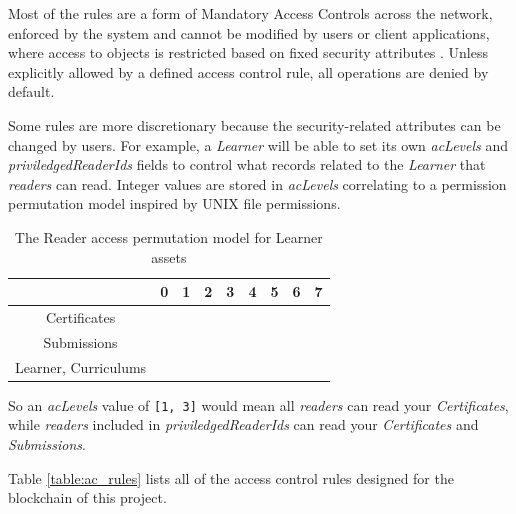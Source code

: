 Most of the rules are a form of Mandatory Access Controls across the network, enforced by the system and cannot be modified by
users or client applications, where access to objects is restricted based on fixed security attributes \citep{yuan2005attributed}.
Unless explicitly allowed by a defined access control rule, all operations are denied by default.

Some rules are more discretionary because the security-related attributes can be changed by users.
For example, a \textit{Learner} will be able to set its own \textit{acLevels} and \textit{priviledgedReaderIds} fields to control
what records related to the \textit{Learner} that \textit{readers} can read. Integer values are stored in \textit{acLevels} correlating to
a permission permutation model inspired by UNIX file permissions.

\begin{table}[!ht]
	\caption{The Reader access permutation model for Learner assets}
	\centering
	\label{table:reader_permutations}
	\begin{tabular}{|c|c|c|c|c|c|c|c|c|}
		\hline
		                     & 0 & 1          & 2          & 3          & 4          & 5          & 6          & 7          \\
		\hline
		Certificates         &   & \checkmark &            & \checkmark &            & \checkmark &            & \checkmark \\
		\hline
		Submissions          &   &            & \checkmark & \checkmark &            &            & \checkmark & \checkmark \\
		\hline
		Learner, Curriculums &   &            &            &            & \checkmark & \checkmark & \checkmark & \checkmark \\
		\hline
	\end{tabular}
\end{table}

So an \textit{acLevels} value of \texttt{[1, 3]} would mean all \textit{readers} can read your \textit{Certificates},
while \textit{readers} included in \textit{priviledgedReaderIds} can read your \textit{Certificates} and \textit{Submissions}.

Table \ref{table:ac_rules} lists all of the access control rules designed for the blockchain of this project.

